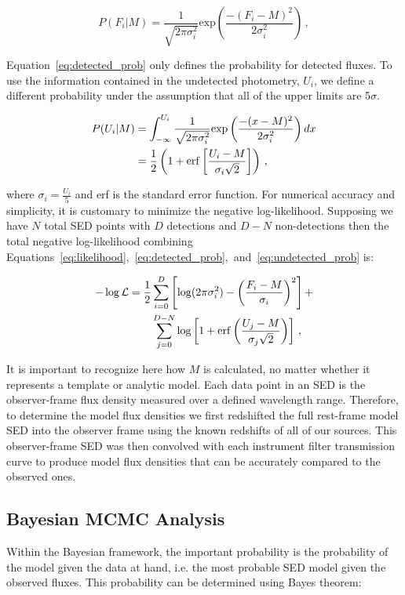 \documentclass[fleqn, usenatbib]{mnras}
\begin{document}
\begin{equation}\label{eq:detected_prob}
P(F_i|M) = \frac{1}{\sqrt{2\pi\sigma_{i}^{2}}}\mathrm{exp}\left(\frac{-(F_i - M)^2}{2\sigma_i^2}\right)\,,
\end{equation}

Equation~\ref{eq:detected_prob} only defines the probability for detected fluxes. To use the information contained in the undetected photometry, $U_i$, we define a different probability under the assumption that all of the upper limits are 5$\sigma$. 

\begin{align}\label{eq:undetected_prob}
P(U_i|M) &= \int_{-\infty}^{U_i}\frac{1}{\sqrt{2\pi\sigma_{i}^{2}}}\mathrm{exp}\left(\frac{-(x - M)^2}{2\sigma_i^2}\right)dx \notag\\
&= \frac{1}{2}\left(1 + \mathrm{erf}\left[\frac{U_i - M}{\sigma_i\sqrt{2}}\right]\right)\,,
\end{align}

\noindent where $\sigma_i = \frac{U_i}{5}$ and erf is the standard error function. For numerical accuracy and simplicity, it is customary to minimize the negative log-likelihood. Supposing we have $N$ total SED points with $D$ detections and $D-N$ non-detections then the total negative log-likelihood combining Equations~\ref{eq:likelihood},~\ref{eq:detected_prob},~and~\ref{eq:undetected_prob} is:

\begin{align}\label{eq:log_like}
-\log\mathcal{L} = \frac{1}{2}&\sum_{i=0}^{D}\left[\log(2\pi\sigma_i^2) - \left(\frac{F_i - M}{\sigma_i}\right)^2\right] + \notag \\
&\sum_{j=0}^{D-N}\log\left[1 + \mathrm{erf}\left(\frac{U_j - M}{\sigma_j\sqrt{2}}\right)\right]\,,
\end{align}

It is important to recognize here how $M$ is calculated, no matter whether it represents a template or analytic model. Each data point in an SED is the observer-frame flux density measured over a defined wavelength range. Therefore, to determine the model flux densities we first redshifted the full rest-frame model SED into the observer frame using the known redshifts of all of our sources. This observer-frame SED was then convolved with each instrument filter transmission curve to produce model flux densities that can be accurately compared to the observed ones.

\subsection{Bayesian MCMC Analysis}
Within the Bayesian framework, the important probability is the probability of the model given the data at hand, i.e. the most probable SED model given the observed fluxes. This probability can be determined using Bayes theorem:
\end{document}
